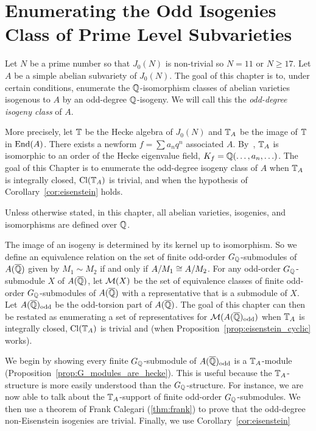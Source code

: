 \documentclass[thesis.tex]{subfiles}
\begin{document}
    
\chapter{Enumerating the Odd Isogenies Class of Prime Level Subvarieties}%
\label{chap:isogeny_class}

Let $N$ be a prime number so that $J_0(N)$ is non-trivial so $N=11$ or $N\geq
17$. Let $A$ be a simple abelian subvariety of $J_0(N)$. The goal of this
chapter is to, under certain conditions, enumerate the $\mathbb{Q}$-isomorphism
classes of abelian varieties isogenous to $A$ by an odd-degree $\mathbb{Q}$-isogeny.
We will call this the \emph{odd-degree isogeny class} of $A$.

More precisely, let $\mathbb{T}$ be the Hecke algebra of $J_0(N)$ and $\mathbb{T}_A$ be the
image of $\mathbb{T}$ in $\operatorname{End}(A)$. There exists a newform $f=\sum a_n q^n$ associated
$A$. By~\cite[Prop. 7.14]{shimura:intro}, $\mathbb{T}_A$ is isomorphic to an order of
the Hecke eigenvalue field, $K_f=\mathbb{Q}(\ldots,a_n,\ldots)$. The goal of this
Chapter is to enumerate the odd-degree isogeny class of $A$ when $\mathbb{T}_A$ is
integrally closed, $\operatorname{Cl}(\mathbb{T}_A)$ is trivial, and when the hypothesis of
Corollary~\ref{cor:eisenstein} holds.


Unless otherwise stated, in this chapter, all abelian varieties, isogenies, and
isomorphisms are defined over $\mathbb{Q}$.

The image of an isogeny is determined by its kernel up to isomorphism. So we
define an equivalence relation on the set of finite odd-order
$G_{\mathbb{Q}}$-submodules of $A(\overline{\mathbb{Q}})$ given by $M_1\sim M_2$ if and only if
$A/M_1\cong A/M_2$. For any odd-order $G_{\mathbb{Q}}$-submodule $X$ of $A(\overline{\mathbb{Q}})$, let
$\mathcal{M}(X)$ be the set of equivalence classes of finite odd-order
$G_{\mathbb{Q}}$-submodules of $A(\overline{\mathbb{Q}})$ with a representative that is a submodule of
$X$. Let $A(\overline{\mathbb{Q}})_{\mathrm{odd}}$ be the odd-torsion part of $A(\overline{\mathbb{Q}})$. The goal of
this chapter can then be restated as enumerating a set of representatives for
$\mathcal{M}(A(\overline{\mathbb{Q}})_{\mathrm{odd}})$ when $\mathbb{T}_A$ is integrally closed, $\operatorname{Cl}(\mathbb{T}_A)$ is trivial
and (when Proposition~\ref{prop:eisenstein_cyclic} works). 

We begin by showing every finite $G_{\mathbb{Q}}$-submodule of $A(\overline{\mathbb{Q}})_{\mathrm{odd}}$ is a
$\mathbb{T}_A$-module (Proposition~\ref{prop:G_modules_are_hecke}). This is useful
because the $\mathbb{T}_A$-structure is more easily understood than the
$G_{\mathbb{Q}}$-structure. For instance, we are now able to talk about the
$\mathbb{T}_A$-support of finite odd-order $G_{\mathbb{Q}}$-submodules. We then use a theorem
of Frank Calegari (\ref{thm:frank}) to prove that the odd-degree non-Eisenstein
isogenies are trivial. Finally, we use Corollary~\ref{cor:eisenstein}
\end{document}
